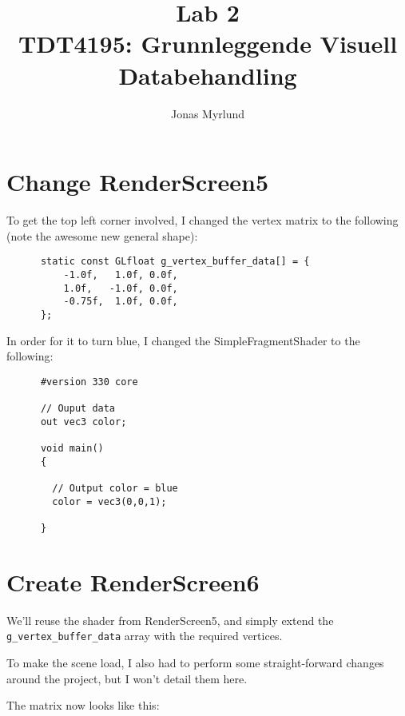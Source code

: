 \documentclass[11pt,a4paper]{article}
\begin{document}
  \title{Lab 2 \\ \large{TDT4195: Grunnleggende Visuell Databehandling}}
  \author{Jonas Myrlund}

  \maketitle
  
  \section{Change RenderScreen5} %
  \label{sec2}
  
    To get the top left corner involved, I changed the vertex matrix to the following (note the awesome new general shape):

    \begin{verbatim}
      static const GLfloat g_vertex_buffer_data[] = {
          -1.0f,   1.0f, 0.0f,
          1.0f,   -1.0f, 0.0f,
          -0.75f,  1.0f, 0.0f,
      };
    \end{verbatim}

    In order for it to turn blue, I changed the SimpleFragmentShader to the following:

    \begin{verbatim}
      #version 330 core

      // Ouput data
      out vec3 color;

      void main()
      {

        // Output color = blue 
        color = vec3(0,0,1);

      }
    \end{verbatim}
  

  \section{Create RenderScreen6} %
  \label{sec:create_renderscreen6}
  
    We'll reuse the shader from RenderScreen5, and simply extend the \texttt{g\_vertex\_buffer\_data} array with the required vertices.

    To make the scene load, I also had to perform some straight-forward changes around the project, but I won't detail them here.

    The matrix now looks like this:
\end{document}
